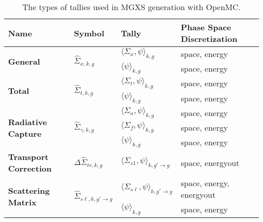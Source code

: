 \begin{table}[h!]
  \centering
  \caption[Tally types for MGXS generation]{The types of tallies used in MGXS generation with OpenMC.}
  \scriptsize
  \label{tab:tally-types}
  \vspace{6pt}
  \begin{tabular}{ m{1.5cm} m{1.2cm} m{2cm} l}
  \toprule
  {\bf Name} &
  {\bf Symbol} &
  {\bf Tally} &
  {\bf Phase Space Discretization} \\

  \midrule

  \multirow{2}{*}{\bf General} & \multirow{2}{*}{$\hat{\Sigma}_{x,k,g}$} & $\langle \Sigma_{x}, \psi \rangle_{k,g}$ & space, energy \\
  \cline{3-4}
  & & $\langle \psi \rangle_{k,g}$ & space, energy \\

  \midrule

  \multirow{2}{*}{\bf Total} & \multirow{2}{*}{$\hat{\Sigma}_{t,k,g}$} & $\langle \Sigma_{t}, \psi \rangle_{k,g}$ & space, energy \\
  \cline{3-4}
  & & $\langle \psi \rangle_{k,g}$ & space, energy \\

  \midrule

  \multirow{3}{*}{\parbox{1.5cm}{\bf Radiative Capture}} & \multirow{3}{*}{$\hat{\Sigma}_{\gamma,k,g}$} & $\langle \Sigma_{a}, \psi \rangle_{k,g}$ & space, energy \\
  \cline{3-4}
  & & $\langle \Sigma_{f}, \psi \rangle_{k,g}$ & space, energy \\
  \cline{3-4}
  & & $\langle \psi \rangle_{k,g}$ & space, energy \\

  \midrule

  \textbf{\parbox{1.5cm}{\bf Transport Correction}} & $\Delta\hat{\Sigma}_{tr,k,g}$ & $\langle \Sigma_{s1}, \psi \rangle_{k,g'\rightarrow g}$ & space, energyout \\

  \midrule

  \multirow{2}{*}{\parbox{1.5cm}{\bf Scattering Matrix}} & \multirow{2}{*}{$\hat{\Sigma}_{s\ell,k,g'\rightarrow g}$} & $\langle \Sigma_{s\ell}, \psi \rangle_{k,g'\rightarrow g}$ & space, energy, energyout \\
  \cline{3-4}
  & & $\langle \psi \rangle_{k,g}$ & space, energy \\

  \midrule


\end{tabular}
\end{table}
